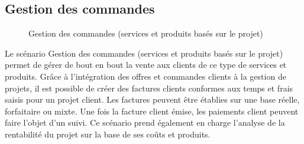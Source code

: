 \subsection{Gestion des commandes}

\begin{figure}[H]
    \label{fig-gestion-commandes}
    \noindent{}
    \caption{Gestion des commandes (services et produits basés sur le projet)}
\end{figure}

Le scénario Gestion des commandes (services et produits basés sur le projet) permet de gérer de bout en bout la vente aux clients de ce type de services et produits. Grâce à l'intégration des offres et commandes clients à la gestion de projets, il est possible de créer des factures clients conformes aux temps et frais saisis pour un projet client. Les factures peuvent être établies sur une base réelle, forfaitaire ou mixte. Une fois la facture client émise, les paiements client peuvent faire l'objet d'un suivi. 
Ce scénario prend également en charge l'analyse de la rentabilité du projet sur la base de ses coûts et produits. \\

